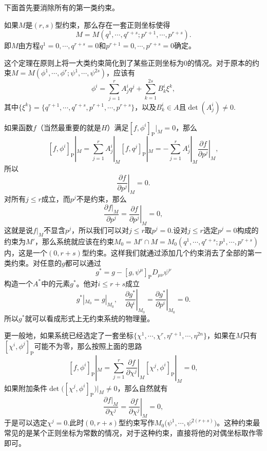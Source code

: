 下面首先要消除所有的第一类约束。
\begin{theo}
	如果$M$是$(r,s)$型约束，那么存在一套正则坐标使得
	\[
		M=M(q^1,\cdots,q^{r+s};p^{r+1},\cdots,p^{r+s}).
	\]
	即$M$由方程$q^1=0,\cdots,q^{r+s}=0$和$p^{r+1}=0,\cdots,p^{r+s}=0$确定。
\end{theo}
这个定理在原则上将一大类约束简化到了某些正则坐标为0的情况。对于原本的约束$M=M(\phi^1,\cdots,\phi^{r};\psi^{1},\cdots,\psi^{2s})$，应该有
\[
	\phi^i=\sum_{j=1}^rA^i_jq^j+\sum_{k=1}^{2s}B^i_k\xi^k,
\]
其中$\{\xi^k\}=\{q^{r+1},\cdots,q^{r+s},p^{r+1},\cdots,p^{r+s}\}$，以及$B^i_k\in A$且$\det(A^i_j)\neq 0$.

如果函数$f$（当然最重要的就是$H$）满足$[f,\phi^i]_{\mathrm{P}}|_M=0$，那么
\[
	[f,\phi^i]_{\mathrm{P}}|_M=\sum_{j=1}^rA^i_j|_M[f,q^j]_{\mathrm{P}}|_M=-\sum_{j=1}^rA^i_j|_M\left.\frac{\partial f}{\partial p^j}\right|_M,
\]
所以
\[
	\left.\frac{\partial f}{\partial p^j}\right|_M=0.
\]
对所有$j\leq r$成立，而$p^j$不是约束，那么
\[
	\frac{\partial f|_M}{\partial p^j}=\left.\frac{\partial f}{\partial p^j}\right|_M=0,
\]
这就是说$f|_M$不显含$p^j$，所以我们可以对$j\leq r$取$p^j=0$.设对$j\leq r$选定$p^j=0$构成的约束为$M'$，那么系统就应该在约束$M_0=M'\cap M=M_0(q^1,\cdots,q^{r+s};p^1,\cdots,p^{r+s})$内，这是一个$(0,r+s)$型约束。这样我们就通过添加几个约束消去了全部的第一类约束。对任意的$g$都可以通过
\[
	g^*=g-[g,\psi^\mu]_{\mathrm{P}}D_{\mu\nu}\psi^\nu
\]
构造一个$A^*$中的元素$g^*$。他对$i\leq r+s$成立
\begin{equation}
	g^*|_{M_0}=g|_{M_0},\quad \left.\frac{\partial g^*}{\partial q^i}\right|_{M_0}=\left.\frac{\partial g^*}{\partial p^i}\right|_{M_0}=0.
	\label{s2:3}
\end{equation}
所以$g^*$就可以看成形式上无约束系统的物理量。

更一般地，如果系统已经选定了一套坐标$\{\chi^1,\cdots,\chi^r,\eta^{r+1},\cdots,\eta^{2n}\}$，如果在$M$只有$[\chi^i,\phi^j]_{\mathrm{P}}$可能不为零，那么按照上面的思路
\[
	[f,\phi^i]_{\mathrm{P}}|_M=\sum_{j=1}^r\left.\frac{\partial f}{\partial \chi^j}\right|_M[\chi^j,\phi^i]_{\mathrm{P}}|_M=0,
\]
如果附加条件$\det\bigl([\chi^j,\phi^i]_{\mathrm{P}}\bigr)|_M\neq 0$，那么自然就有
\[
	\frac{\partial f|_M}{\partial \chi^j}=\left.\frac{\partial f}{\partial \chi^j}\right|_M=0,
\]
于是可以选定$\chi^j=0$.此时$(0,r+s)$型约束写作$M_0\bigl(\psi^{1},\cdots,\psi^{2(r+s)}\bigr)$。这种约束最常见的是某个正则坐标为常数的情况，对于这种约束，直接将他的对偶坐标取作零即可。

